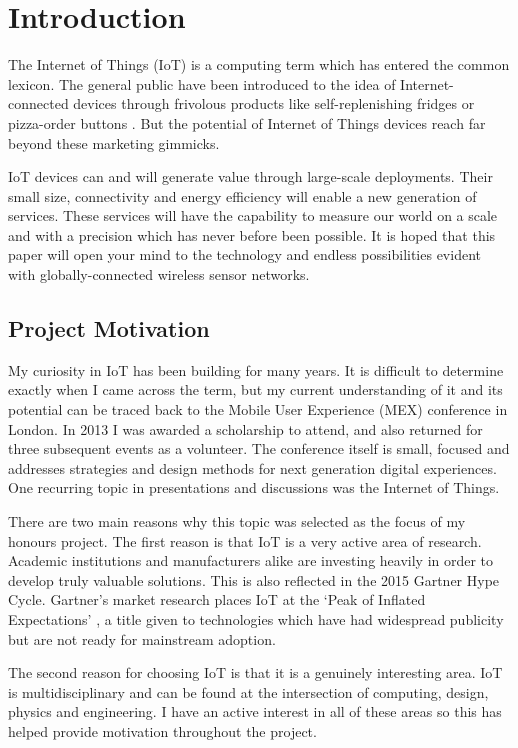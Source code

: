 \chapter{Introduction}
  The Internet of Things (IoT) is a computing term which has entered the common lexicon. The general public have been introduced to the idea of Internet-connected devices through frivolous products like self-replenishing fridges or pizza-order buttons \citep{dominos-order}. But the potential of Internet of Things devices reach far beyond these marketing gimmicks.

  IoT devices can and will generate value through large-scale deployments. Their small size, connectivity and energy efficiency will enable a new generation of services. These services will have the capability to measure our world on a scale and with a precision which has never before been possible. It is hoped that this paper will open your mind to the technology and endless possibilities evident with globally-connected wireless sensor networks.

  \section{Project Motivation}
    My curiosity in IoT has been building for many years. It is difficult to determine exactly when I came across the term, but my current understanding of it and its potential can be traced back to the Mobile User Experience (MEX) conference in London. In 2013 I was awarded a scholarship to attend, and also returned for three subsequent events as a volunteer. The conference itself is small, focused and addresses strategies and design methods for next generation digital experiences. One recurring topic in presentations and discussions was the Internet of Things.

    There are two main reasons why this topic was selected as the focus of my honours project. The first reason is that IoT is a very active area of research. Academic institutions and manufacturers alike are investing heavily in order to develop truly valuable solutions. This is also reflected in the 2015 Gartner Hype Cycle. Gartner's market research places IoT at the `Peak of Inflated Expectations' \citep{gartner-hype-cycle}, a title given to technologies which have had widespread publicity but are not ready for mainstream adoption.

    The second reason for choosing IoT is that it is a genuinely interesting area. IoT is multidisciplinary and can be found at the intersection of computing, design, physics and engineering. I have an active interest in all of these areas so this has helped provide motivation throughout the project.

